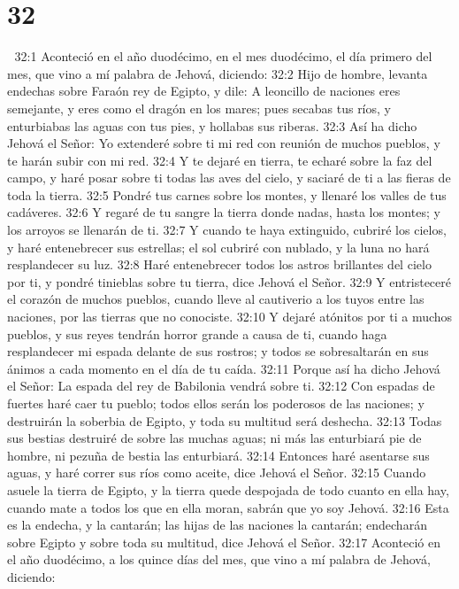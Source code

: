\chapter{32}


32:1 Aconteció en el año duodécimo, en el mes duodécimo, el día primero del mes, que vino a mí palabra de Jehová, diciendo:  
32:2 Hijo de hombre, levanta endechas sobre Faraón rey de Egipto, y dile: A leoncillo de naciones eres semejante, y eres como el dragón en los mares; pues secabas tus ríos, y enturbiabas las aguas con tus pies, y hollabas sus riberas.  
32:3 Así ha dicho Jehová el Señor: Yo extenderé sobre ti mi red con reunión de muchos pueblos, y te harán subir con mi red.  
32:4 Y te dejaré en tierra, te echaré sobre la faz del campo, y haré posar sobre ti todas las aves del cielo, y saciaré de ti a las fieras de toda la tierra.  
32:5 Pondré tus carnes sobre los montes, y llenaré los valles de tus cadáveres.  
32:6 Y regaré de tu sangre la tierra donde nadas, hasta los montes; y los arroyos se llenarán de ti.  
32:7 Y cuando te haya extinguido, cubriré los cielos, y haré entenebrecer sus estrellas; el sol cubriré con nublado, y la luna no hará resplandecer su luz. 
32:8 Haré entenebrecer todos los astros brillantes del cielo por ti, y pondré tinieblas sobre tu tierra, dice Jehová el Señor.  
32:9 Y entristeceré el corazón de muchos pueblos, cuando lleve al cautiverio a los tuyos entre las naciones, por las tierras que no conociste.  
32:10 Y dejaré atónitos por ti a muchos pueblos, y sus reyes tendrán horror grande a causa de ti, cuando haga resplandecer mi espada delante de sus rostros; y todos se sobresaltarán en sus ánimos a cada momento en el día de tu caída.  
32:11 Porque así ha dicho Jehová el Señor: La espada del rey de Babilonia vendrá sobre ti.  
32:12 Con espadas de fuertes haré caer tu pueblo; todos ellos serán los poderosos de las naciones; y destruirán la soberbia de Egipto, y toda su multitud será deshecha.  
32:13 Todas sus bestias destruiré de sobre las muchas aguas; ni más las enturbiará pie de hombre, ni pezuña de bestia las enturbiará.  
32:14 Entonces haré asentarse sus aguas, y haré correr sus ríos como aceite, dice Jehová el Señor.  
32:15 Cuando asuele la tierra de Egipto, y la tierra quede despojada de todo cuanto en ella hay, cuando mate a todos los que en ella moran, sabrán que yo soy Jehová.  
32:16 Esta es la endecha, y la cantarán; las hijas de las naciones la cantarán; endecharán sobre Egipto y sobre toda su multitud, dice Jehová el Señor.  
32:17 Aconteció en el año duodécimo, a los quince días del mes, que vino a mí palabra de Jehová, diciendo:  
